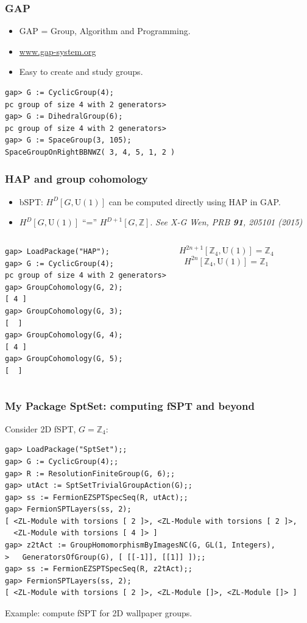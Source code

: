\documentclass[xcolor=table, aspectratio=169]{beamer}
\newcommand{\uone}{\mathrm U(1)}
\begin{document}
\begin{frame}[fragile]
\frametitle{GAP}
\begin{itemize}
\item GAP = Group, Algorithm and Programming.
\item \url{www.gap-system.org}
\item Easy to create and study groups.
\end{itemize}

\begin{lstlisting}[basicstyle=\footnotesize]
gap> G := CyclicGroup(4);
pc group of size 4 with 2 generators>
gap> G := DihedralGroup(6);
pc group of size 4 with 2 generators>
gap> G := SpaceGroup(3, 105);
SpaceGroupOnRightBBNWZ( 3, 4, 5, 1, 2 )
\end{lstlisting}

\end{frame}

\begin{frame}[fragile]
	\frametitle{HAP and group cohomology}
	\begin{itemize}
		\item bSPT: $H^D[G,\uone]$ can be computed directly using HAP in GAP.
		\item $H^D[G,\uone]$ ``='' $H^{D+1}[G,\mathbb Z]$. \emph{See X-G Wen, PRB \textbf{91}, 205101 (2015)}
	\end{itemize}
	\begin{columns}
	\begin{lstlisting}[basicstyle=\footnotesize]
gap> LoadPackage("HAP");
gap> G := CyclicGroup(4);
pc group of size 4 with 2 generators>
gap> GroupCohomology(G, 2);
[ 4 ]
gap> GroupCohomology(G, 3);
[  ]
gap> GroupCohomology(G, 4);
[ 4 ]
gap> GroupCohomology(G, 5);
[  ]
\end{lstlisting}
	\[H^{2n+1}[\mathbb Z_4,\uone] = \mathbb Z_4\]
	\[H^{2n}[\mathbb Z_4,\uone] = \mathbb Z_1\]
	\end{columns}
\end{frame}

\begin{frame}[fragile]
	\frametitle{My Package SptSet: computing fSPT and beyond}
	Consider 2D fSPT, $G=\mathbb Z_4$:
\begin{lstlisting}[basicstyle=\footnotesize]
gap> LoadPackage("SptSet");;
gap> G := CyclicGroup(4);;
gap> R := ResolutionFiniteGroup(G, 6);;
gap> utAct := SptSetTrivialGroupAction(G);;
gap> ss := FermionEZSPTSpecSeq(R, utAct);;
gap> FermionSPTLayers(ss, 2);
[ <ZL-Module with torsions [ 2 ]>, <ZL-Module with torsions [ 2 ]>,
  <ZL-Module with torsions [ 4 ]> ]
gap> z2tAct := GroupHomomorphismByImagesNC(G, GL(1, Integers),
>   GeneratorsOfGroup(G), [ [[-1]], [[1]] ]);;
gap> ss := FermionEZSPTSpecSeq(R, z2tAct);;
gap> FermionSPTLayers(ss, 2);
[ <ZL-Module with torsions [ 2 ]>, <ZL-Module []>, <ZL-Module []> ]
\end{lstlisting}

Example: compute fSPT for 2D wallpaper groups.
\end{frame}
\end{document}
